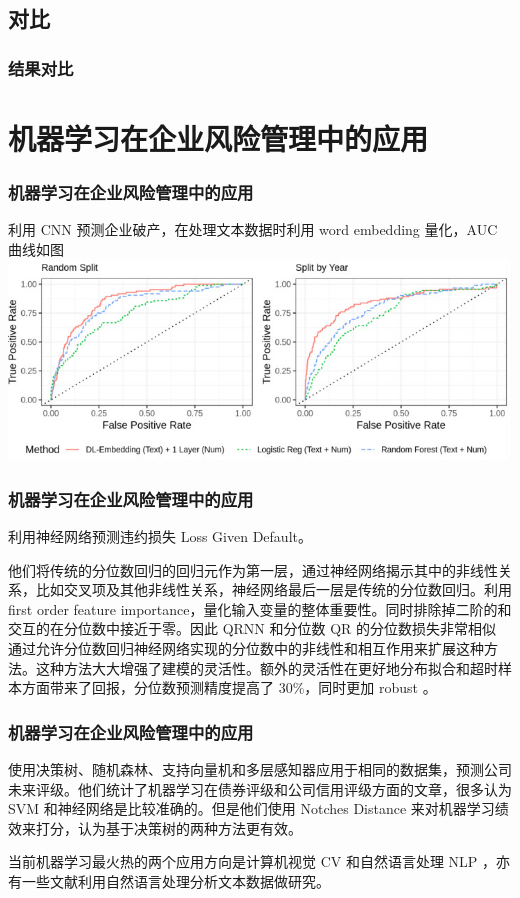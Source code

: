 \documentclass{ctexbeamer}
\begin{document}
\subsection{对比}
\begin{frame}
    \frametitle{结果对比}
\end{frame}
\section{机器学习在企业风险管理中的应用}

\begin{frame}
    \frametitle{机器学习在企业风险管理中的应用}
    \Textcite{mai2019deep} 利用 CNN 预测企业破产，在处理文本数据时利用 word embedding 量化，AUC 曲线如图
    \includegraphics[width=\linewidth]{../lib/mlinerm.jpg}
\end{frame}
\begin{frame}
    \frametitle{机器学习在企业风险管理中的应用}
    \Textcite{kellner2022opening} 利用神经网络预测违约损失 Loss Given Default。

    他们将传统的分位数回归的回归元作为第一层，通过神经网络揭示其中的非线性关系，比如交叉项及其他非线性关系，神经网络最后一层是传统的分位数回归。利用 first order feature importance，量化输入变量的整体重要性。同时排除掉二阶的和交互的在分位数中接近于零。因此 QRNN 和分位数 QR 的分位数损失非常相似
    通过允许分位数回归神经网络实现的分位数中的非线性和相互作用来扩展这种方法。这种方法大大增强了建模的灵活性。额外的灵活性在更好地分布拟合和超时样本方面带来了回报，分位数预测精度提高了 30\%，同时更加 robust 。
\end{frame}
\begin{frame}
    \frametitle{机器学习在企业风险管理中的应用}
    \Textcite{golbayani2020comparative}
    使用决策树、随机森林、支持向量机和多层感知器应用于相同的数据集，预测公司未来评级。他们统计了机器学习在债券评级和公司信用评级方面的文章，很多认为 SVM 和神经网络是比较准确的。但是他们使用 Notches Distance 来对机器学习绩效来打分，认为基于决策树的两种方法更有效。

    当前机器学习最火热的两个应用方向是计算机视觉 CV 和自然语言处理 NLP ，亦有一些文献利用自然语言处理分析文本数据做研究。
\end{frame}
\end{document}

